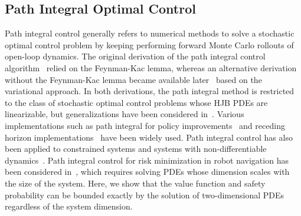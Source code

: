 \documentclass[letterpaper]{article} %
\newcommand{\todo}[1]{\textcolor{blue}{[TODO: #1]}}
\begin{document}
\subsection{Path Integral Optimal Control}
 Path integral control generally refers to numerical methods to solve a stochastic optimal control problem by keeping performing forward Monte Carlo rollouts of open-loop dynamics. The original derivation of the path integral control algorithm~\cite{kappen2005path} relied on the Feynman-Kac lemma, whereas an alternative derivation without the Feynman-Kac lemma became available later~\cite{theodorou2012relative} based on the variational approach. In both derivations, the path integral method is restricted to the class of stochastic optimal control problems whose HJB PDEs are linearizable, but generalizations have been considered in~\cite{satoh2016iterative,williams2017information}. Various implementations such as path integral for policy improvements~\cite{theodorou2010generalized} and receding horizon implementations~\cite{williams2017model} have been widely used. Path integral control has also been applied to constrained systems and systems with non-differentiable dynamics~\cite{satoh2020nonlinear,carius2022constrained}. Path integral control for risk minimization in robot navigation has been considered in~\cite{patil2022chance}, which requires solving PDEs whose dimension scales with the size of the system. Here, we show that the value function and safety probability can be bounded exactly by the solution of two-dimensional PDEs regardless of the system dimension. 
\end{document}

